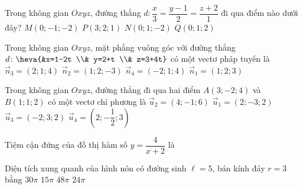 \begin{ex}%
	Trong không gian $Oxyz$, đường thẳng $d\colon \dfrac{x}{3}=\dfrac{y-1}{2}=\dfrac{z+2}{1}$ đi qua điểm nào dưới đây?
	\choice
	{$M(0 ;-1 ;-2)$}
	{$P(3 ; 2 ; 1)$}
	{\True $N(0 ; 1 ;-2)$}
	{$Q(0 ; 1 ; 2)$}
\end{ex}
\begin{ex}%
	Trong không gian $Oxyz$, mặt phẳng vuông góc với đường thẳng $d\colon \heva{&x=1-2t \\& y=2+t \\& z=3+4t}$ có một vectơ pháp tuyến là
	\choice
	{$\overrightarrow{n}_3=(2;1;4)$}
	{$\overrightarrow{n}_2=(1;2;-3)$}
	{\True $\overrightarrow{n}_4=(-2;1;4)$}
	{$\overrightarrow{n}_1=(1;2;3)$}
\end{ex}
\begin{ex}%
	Trong không gian $Oxyz$, đường thẳng đi qua hai điểm $A(3;-2;4)$ và $B(1;1;2)$ có một vectơ chỉ phương là
	\choice
	{$\overrightarrow{u}_2=(4;-1;6)$}
	{\True $\overrightarrow{u}_1=(2;-3;2)$}
	{$\overrightarrow{u}_3=(-2;3;2)$}
	{$\overrightarrow{u}_4=\left(2;-\dfrac{1}{2};3\right)$}
\end{ex}

\begin{ex}%
	Tiệm cận đứng của đồ thị hàm số $y=\dfrac{4}{x+2}$ là
\end{ex}

\begin{ex}%
	Diện tích xung quanh của hình nón có đường sinh $\ell=5$, bán kính đáy $r=3$ bằng
	\choice
	{$30 \pi$}
	{\True $15 \pi$}
	{$48 \pi$}
	{$24 \pi$}
\end{ex}

